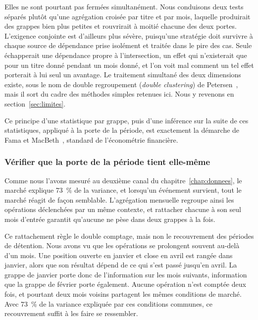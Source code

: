 Elles ne sont pourtant pas fermées simultanément. Nous conduisons deux tests
séparés plutôt qu'une agrégation croisée par titre et par mois, laquelle
produirait des grappes bien plus petites et rouvrirait à moitié chacune des
deux portes. L'exigence conjointe est d'ailleurs plus sévère, puisqu'une
stratégie doit survivre à chaque source de dépendance prise isolément et
traitée dans le pire des cas. Seule échapperait une dépendance propre à
l'intersection, un effet qui n'existerait que pour un titre donné pendant un
mois donné, et l'on voit mal comment un tel effet porterait à lui seul un
avantage. Le traitement simultané des deux dimensions existe, sous le nom de
double regroupement (\emph{double clustering}) de Petersen~\cite{petersen2009},
mais il sort du cadre des méthodes simples retenues ici. Nous y revenons en
section~\ref{sec:limites}.

Ce principe d'une statistique par grappe, puis d'une inférence sur la suite de
ces statistiques, appliqué à la porte de la période, est exactement la démarche
de Fama et MacBeth~\cite{famamacbeth1973}, standard de l'économétrie financière.



\subsubsection*{Vérifier que la porte de la période tient elle-même}

Comme nous l'avons mesuré au deuxième canal du chapitre~\ref{chap:donnees}, le
marché explique 73~\% de la variance, et lorsqu'un événement survient, tout le
marché réagit de façon semblable. L'agrégation mensuelle regroupe ainsi les
opérations déclenchées par un même contexte, et rattacher chacune à son seul
mois d'entrée garantit qu'aucune ne pèse dans deux grappes à la fois.

Ce rattachement règle le double comptage, mais non le recouvrement des
périodes de détention. Nous avons vu que les opérations se prolongent souvent
au-delà d'un mois. Une position ouverte en janvier et close en avril est rangée
dans janvier, alors que son résultat dépend de ce qui s'est passé jusqu'en
avril. La grappe de janvier porte donc de l'information sur les mois suivants,
information que la grappe de février porte également. Aucune opération n'est
comptée deux fois, et pourtant deux mois voisins partagent les mêmes conditions
de marché. Avec 73~\% de la variance expliquée par ces conditions communes, ce
recouvrement suffit à les faire se ressembler.

